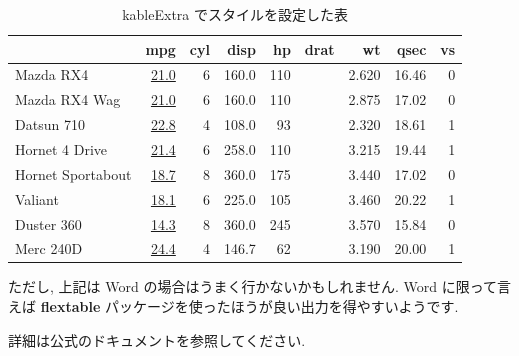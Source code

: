 \documentclass[
]{ltjsarticle}
\begin{document}
\begin{table}

\caption{\label{tab:table-example2}kableExtra でスタイルを設定した表}
\centering
\begin{tabular}{l>{}rrrr>{}rrrr}
\toprule
  & mpg & cyl & disp & hp & drat & wt & qsec & vs\\
\midrule
Mazda RX4 & \href{https://haozhu233.github.io/kableExtra/}{\textcolor[HTML]{34B679}{21.0}} & 6 & 160.0 & 110 & \cellcolor[HTML]{43BF71}{\textcolor{white}{3.90}} & 2.620 & 16.46 & 0\\
Mazda RX4 Wag & \href{https://haozhu233.github.io/kableExtra/}{\textcolor[HTML]{34B679}{21.0}} & 6 & 160.0 & 110 & \cellcolor[HTML]{43BF71}{\textcolor{white}{3.90}} & 2.875 & 17.02 & 0\\
Datsun 710 & \href{https://haozhu233.github.io/kableExtra/}{\textcolor[HTML]{95D840}{22.8}} & 4 & 108.0 & 93 & \cellcolor[HTML]{37B878}{\textcolor{white}{3.85}} & 2.320 & 18.61 & 1\\
Hornet 4 Drive & \href{https://haozhu233.github.io/kableExtra/}{\textcolor[HTML]{44BF70}{21.4}} & 6 & 258.0 & 110 & \cellcolor[HTML]{414387}{\textcolor{white}{3.08}} & 3.215 & 19.44 & 1\\
Hornet Sportabout & \href{https://haozhu233.github.io/kableExtra/}{\textcolor[HTML]{26818E}{18.7}} & 8 & 360.0 & 175 & \cellcolor[HTML]{3C4F8A}{\textcolor{white}{3.15}} & 3.440 & 17.02 & 0\\
\addlinespace
Valiant & \href{https://haozhu233.github.io/kableExtra/}{\textcolor[HTML]{2C728E}{18.1}} & 6 & 225.0 & 105 & \cellcolor[HTML]{440154}{\textcolor{white}{2.76}} & 3.460 & 20.22 & 1\\
Duster 360 & \href{https://haozhu233.github.io/kableExtra/}{\textcolor[HTML]{440154}{14.3}} & 8 & 360.0 & 245 & \cellcolor[HTML]{375A8C}{\textcolor{white}{3.21}} & 3.570 & 15.84 & 0\\
Merc 240D & \href{https://haozhu233.github.io/kableExtra/}{\textcolor[HTML]{FDE725}{24.4}} & 4 & 146.7 & 62 & \cellcolor[HTML]{1FA187}{\textcolor{white}{3.69}} & 3.190 & 20.00 & 1\\
\bottomrule
\end{tabular}
\end{table}

ただし, 上記は Word の場合はうまく行かないかもしれません. Word に限って言えば \textbf{flextable} パッケージを使ったほうが良い出力を得やすいようです.

詳細は公式のドキュメントを参照してください.
\end{document}
